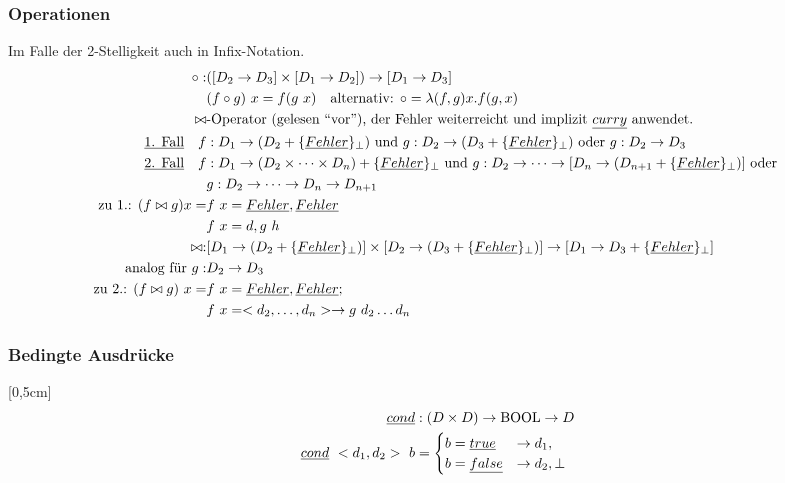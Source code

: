 \subsubsection{Operationen}
Im Falle der 2-Stelligkeit auch in Infix-Notation.
\begin{align*}
\circ: &([D_2 \rightarrow D_3] \times [D_1 \rightarrow D_2]) \rightarrow [D_1 \rightarrow D_3]\\
& (f \circ g)\ x = f (g \ x) \quad \text{alternativ: } \circ = \lambda	 (f,g)x.f(g,x)\\ 
\bowtie &\text{-Operator (gelesen ``vor''), der Fehler weiterreicht und implizit } \underline{curry} \text{ anwendet.}\\
\text{\underline{1. Fall}} \quad f &: D_1 \rightarrow (D_2 + \{\underline{Fehler}\}_\perp) \text{ und } g: D_2 \rightarrow (D_3 + \{\underline{Fehler}\}_\perp) \text{ oder } g: D_2 \rightarrow D_3\\
\text{\underline{2. Fall}} \quad f &: D_1 \rightarrow (D_2 \times \dots \times D_n) + \{\underline{Fehler}\}_\perp \text{ und }  g : D_2 \rightarrow \dots \rightarrow [D_n \rightarrow (D_{n+1} + \{\underline{Fehler}\}_\perp)] \text{ oder } \\
& g : D_2 \rightarrow \dots \rightarrow D_n \rightarrow D_{n+1}\\
\text{zu 1.: } (f \bowtie g) x = & f\ x = \underline{Fehler}, \underline{Fehler}\\
& f\ x = d, g\ h \\
\bowtie :& [D_1 \rightarrow ( D_2 + \{\underline{Fehler}\}_\perp) ] \times [D_2 \rightarrow (D_3 + \{\underline{Fehler}\}_\perp)] \rightarrow [D_1 \rightarrow D_3 + \{\underline{Fehler}\}_\perp] \\
\text{analog für } g :& D_2 \rightarrow D_3\\
\text{zu 2.: } (f \bowtie g) \ x = & f \ x = \underline{Fehler}, \underline{Fehler} ;\\
& f\ x = < d_2 , \dots , d_n> \rightarrow g \ d_2 \dots d_n \\
\end{align*}
\subsubsection{Bedingte Ausdrücke}
[0,5cm]
\begin{align*}
\underline{cond} &: (D \times D) \rightarrow \text{\lstinline!BOOL!} \rightarrow D \\
\underline{cond}\ <d_1,d_2> \ b &= \begin{cases}
b = \underline{true} & \rightarrow d_1,\\
b = \underline{false} & \rightarrow d_2, \perp
\end{cases}
\end{align*}
